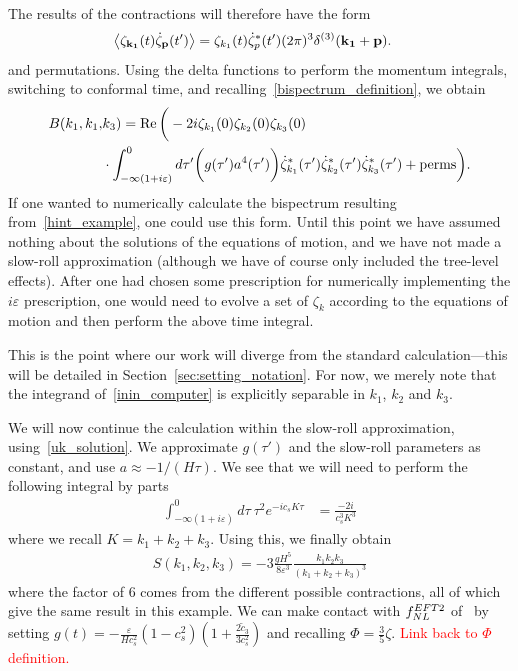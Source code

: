 The results of the contractions will therefore have the form
\begin{align}
    \left<\zeta_{\mathbf{k_1}}(t)\dot{\zeta}_{\mathbf{p}}(t')\right>
    &= \zeta_{k_1}(t)\dot{\zeta}^*_{p}(t')(2\pi)^3\delta^{(3)}(\mathbf{k_1}+\mathbf{p}).
\end{align}
and permutations.
Using the delta functions to perform the momentum integrals,
switching to conformal time,
and recalling~\eqref{bispectrum_definition}, we obtain
\begin{align}\label{inin_computer}
    B(k_1, k_1,&k_3)
    =
    \operatorname{Re}\bigg(-2i \zeta_{k_1}(0)\zeta_{k_2}(0)\zeta_{k_3}(0)\nonumber\\
    &\cdot\int_{-\infty(1+i\varepsilon)}^{0}d\tau'\bigg(g(\tau') a^4(\tau')\bigg)
    \dot{\zeta}^*_{k_1}(\tau')
    \dot{\zeta}^*_{k_2}(\tau')
    \dot{\zeta}^*_{k_3}(\tau')
    +\text{perms}
    \bigg).
\end{align}
If one wanted to numerically calculate the bispectrum resulting from~\eqref{hint_example},
one could use this form. Until this point we have assumed nothing about the solutions of the
equations of motion, and we have not made a slow-roll approximation (although we have
of course only included the tree-level effects).
After one had chosen some prescription for numerically implementing the
$i\varepsilon$ prescription, one would need to evolve a set of $\zeta_{k}$
according to the equations of motion and then perform the above time integral.


This is the point where our work will diverge from the standard calculation---this
will be detailed in Section~\ref{sec:setting_notation}. For now, we merely note that
the integrand of~\eqref{inin_computer} is explicitly separable in $k_1$, $k_2$ and $k_3$.


We will now continue the calculation within the slow-roll approximation,
using~\eqref{uk_solution}. We approximate $g(\tau')$ and the slow-roll
parameters as constant, and use $a\approx-1/(H\tau)$.
We see that we will need to perform the following integral by parts
\begin{align}
    \int_{-\infty(1+i\varepsilon)}^{0}d\tau~\tau^2 e^{-ic_sK\tau}
    &= \frac{-2i}{c_s^3K^3}
\end{align}
where we recall $K=k_1+k_2+k_3$.
Using this, we finally obtain
\begin{align}
    S(k_1, k_2, k_3) = -3\frac{g H^5}{8\varepsilon^3}\frac{k_1k_2k_3}{(k_1+k_2+k_3)^3}
\end{align}
where the factor of $6$ comes from the different possible contractions, all
of which give the same result in this example.
We can make contact with $f_{NL}^{EFT2}$ of~\cite{Planck_NG_2018, Senatore_wmap_2009}
by setting $g(t)=-\frac{\varepsilon}{Hc_s^2}(1-c_s^2)\left(1+\frac{2\tilde{c}_3}{3c_s^2}\right)$
and recalling $\Phi=\frac{3}{5}\zeta$.
\textcolor{red}{Link back to $\Phi$ definition.}


